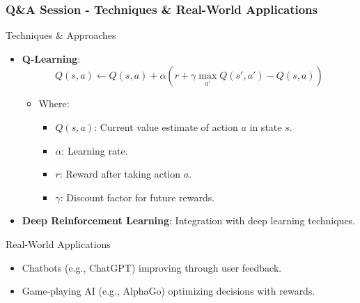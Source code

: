 \documentclass[aspectratio=169]{beamer}
\begin{document}
\begin{frame}[fragile]
    \frametitle{Q\&A Session - Techniques & Real-World Applications}
    \begin{block}{Techniques & Approaches}
        \begin{itemize}
            \item \textbf{Q-Learning}:
            \begin{equation}
                Q(s, a) \leftarrow Q(s, a) + \alpha \left( r + \gamma \max_{a'} Q(s', a') - Q(s, a) \right)
            \end{equation}
            \begin{itemize}
                \item Where:
                \begin{itemize}
                    \item $Q(s, a)$: Current value estimate of action $a$ in state $s$.
                    \item $\alpha$: Learning rate.
                    \item $r$: Reward after taking action $a$.
                    \item $\gamma$: Discount factor for future rewards.
                \end{itemize}
            \end{itemize}
            \item \textbf{Deep Reinforcement Learning}: Integration with deep learning techniques.
        \end{itemize}
    \end{block}
    
    \begin{block}{Real-World Applications}
        \begin{itemize}
            \item Chatbots (e.g., ChatGPT) improving through user feedback.
            \item Game-playing AI (e.g., AlphaGo) optimizing decisions with rewards.
        \end{itemize}
    \end{block}
\end{frame}
\end{document}
